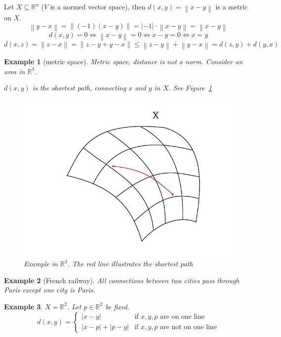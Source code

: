 \documentclass{article}
\newtheorem{example}{Example}  \numberwithin{example}{section}
\newcommand{\norm}[1]{\left\|#1\right\|}
\newcommand{\card}[1]{\left|#1\right|}
\begin{document}
Let $X \subseteq \mathbb R^n$ ($V$ is a normed vector space), then $d(x, y) = \norm{x - y}$ is a metric on $X$.
\[ \norm{y - x} = \norm{(-1) (x - y)} = \card{-1} \cdot \norm{x - y} = \norm{x - y} \]
\[ d(x, y) = 0 \iff \norm{x - y} = 0 \iff x - y = 0 \iff x = y \]
\[ d(x, z) = \norm{z - x} = \norm{z - y + y - x} \leq \norm{z - y} + \norm{y - x} = d(z, y) + d(y, x) \]

\begin{example}[metric space]
  Metric space, distance is not a norm.
  Consider an area in $\mathbb R^3$.

  $d(x,y)$ is the shortest path, connecting $x$ and $y$ in $X$.
  See Figure~\ref{img:example-r3}

  \begin{figure}
    \begin{center}
      \includegraphics{img/01_example.pdf}
      \caption{Example in $\mathbb R^3$. The red line illustrates the shortest path}
      \label{img:example-r3}
    \end{center}
  \end{figure}
\end{example}

\begin{example}[French railway]
  All connections between two cities pass through Paris except one city is Paris.
\end{example}

\begin{example}
  $X = \mathbb R^2$. Let $p \in \mathbb R^2$ be fixed.
  \[
    d(x, y) = \begin{cases}
      \card{x - y}                & \text{if } x, y, p \text{ are on one line} \\
      \card{x - p} + \card{p - y} & \text{if } x, y, p \text{ are not on one line}
    \end{cases}
  \]
\end{example}
\end{document}
